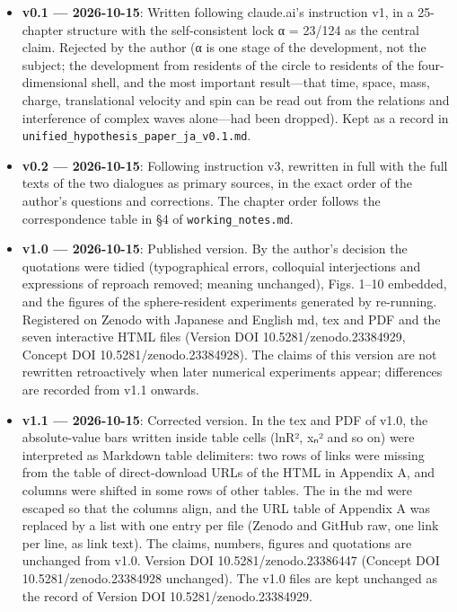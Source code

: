 \documentclass[
  a4paper,
]{article}
\providecommand{\tightlist}{%
  \setlength{\itemsep}{0pt}\setlength{\parskip}{0pt}}
\begin{document}
\begin{itemize}
\tightlist
\item
  \textbf{v0.1 --- 2026-10-15}: Written following claude.ai's
  instruction v1, in a 25-chapter structure with the self-consistent
  lock α = 23/124 as the central claim. Rejected by the author (α is one
  stage of the development, not the subject; the development from
  residents of the circle to residents of the four-dimensional shell,
  and the most important result---that time, space, mass, charge,
  translational velocity and spin can be read out from the relations and
  interference of complex waves alone---had been dropped). Kept as a
  record in \texttt{unified\_\allowbreak{}hypothesis\_\allowbreak{}paper\_\allowbreak{}ja\_\allowbreak{}v0.1.md}.
\item
  \textbf{v0.2 --- 2026-10-15}: Following instruction v3, rewritten in
  full with the full texts of the two dialogues as primary sources, in
  the exact order of the author's questions and corrections. The chapter
  order follows the correspondence table in §4 of
  \texttt{working\_\allowbreak{}notes.md}.
\item
  \textbf{v1.0 --- 2026-10-15}: Published version. By the author's
  decision the quotations were tidied (typographical errors, colloquial
  interjections and expressions of reproach removed; meaning unchanged),
  Figs. 1--10 embedded, and the figures of the sphere-resident
  experiments generated by re-running. Registered on Zenodo with
  Japanese and English md, tex and PDF and the seven interactive HTML
  files (Version DOI 10.5281/zenodo.23384929, Concept DOI
  10.5281/zenodo.23384928). The claims of this version are not rewritten
  retroactively when later numerical experiments appear; differences are
  recorded from v1.1 onwards.
\item
  \textbf{v1.1 --- 2026-10-15}: Corrected version. In the tex and PDF of
  v1.0, the absolute-value bars \texttt{\textbar{}} written inside table
  cells (ln\textbar R²\textbar, \textbar xₙ\textbar² and so on) were
  interpreted as Markdown table delimiters: two rows of links were
  missing from the table of direct-download URLs of the HTML in Appendix
  A, and columns were shifted in some rows of other tables. The
  \texttt{\textbar{}} in the md were escaped so that the columns align,
  and the URL table of Appendix A was replaced by a list with one entry
  per file (Zenodo and GitHub raw, one link per line, as link text). The
  claims, numbers, figures and quotations are unchanged from v1.0.
  Version DOI 10.5281/zenodo.23386447 (Concept DOI
  10.5281/zenodo.23384928 unchanged). The v1.0 files are kept unchanged
  as the record of Version DOI 10.5281/zenodo.23384929.
\end{itemize}
\end{document}
